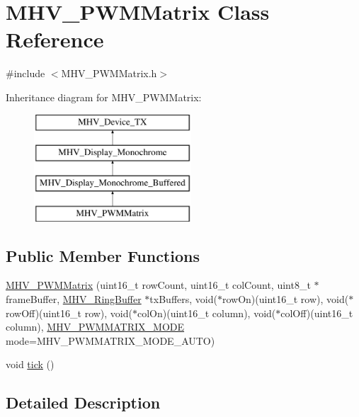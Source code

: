 \hypertarget{class_m_h_v___p_w_m_matrix}{
\section{\-M\-H\-V\-\_\-\-P\-W\-M\-Matrix \-Class \-Reference}
\label{class_m_h_v___p_w_m_matrix}
}


{\ttfamily \#include $<$\-M\-H\-V\-\_\-\-P\-W\-M\-Matrix.\-h$>$}

\-Inheritance diagram for \-M\-H\-V\-\_\-\-P\-W\-M\-Matrix\-:\begin{figure}[H]
\begin{center}
\leavevmode
\includegraphics[height=4.000000cm]{class_m_h_v___p_w_m_matrix}
\end{center}
\end{figure}
\subsection*{\-Public \-Member \-Functions}
\begin{DoxyCompactItemize}
\item 
\hyperlink{class_m_h_v___p_w_m_matrix_a769edbbde18d15e559b2af6a0b0e07b7}{\-M\-H\-V\-\_\-\-P\-W\-M\-Matrix} (uint16\-\_\-t row\-Count, uint16\-\_\-t col\-Count, uint8\-\_\-t $\ast$frame\-Buffer, \hyperlink{class_m_h_v___ring_buffer}{\-M\-H\-V\-\_\-\-Ring\-Buffer} $\ast$tx\-Buffers, void($\ast$row\-On)(uint16\-\_\-t row), void($\ast$row\-Off)(uint16\-\_\-t row), void($\ast$col\-On)(uint16\-\_\-t column), void($\ast$col\-Off)(uint16\-\_\-t column), \hyperlink{_m_h_v___p_w_m_matrix_8h_a6cc1d016b3af074f35a0248396cf6b73}{\-M\-H\-V\-\_\-\-P\-W\-M\-M\-A\-T\-R\-I\-X\-\_\-\-M\-O\-D\-E} mode=\-M\-H\-V\-\_\-\-P\-W\-M\-M\-A\-T\-R\-I\-X\-\_\-\-M\-O\-D\-E\-\_\-\-A\-U\-T\-O)
\item 
void \hyperlink{class_m_h_v___p_w_m_matrix_ae2f403a7f4f290f78752dfc4e85cde20}{tick} ()
\end{DoxyCompactItemize}


\subsection{\-Detailed \-Description}


